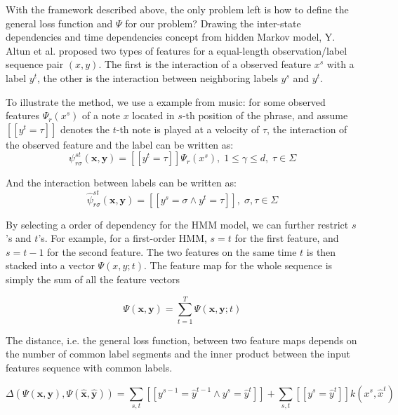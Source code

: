 With the framework described above, the only problem left is how to define the general loss function and $\Psi$ for our problem? Drawing the inter-state dependencies and time dependencies concept from hidden Markov model, Y. Altun et al.\cite{svm2003} proposed two types of features for a equal-length observation/label sequence pair $(x,y)$. The first is the interaction of a observed feature $x^s$ with a label $y^t$, the other is the interaction between neighboring labels $y^s$ and $y^t$. 


To illustrate the method, we use a example from music: for some observed features $\Psi_r(x^s)$ of a note $x$ located in $s$-th position of the phrase, and assume $\left[ \left[ y^t = \tau \right] \right]$ denotes the $t$-th note is played at a velocity of $\tau$, the interaction of the observed feature and the label can be written as:
$$\psi^{st}_{r\sigma}(\mathbf{x}, \mathbf{y}) = \left[\left[y^t = \tau \right] \right]\Psi_r(x^s),\; 1\leq\gamma\leq d,\; \tau \in \Sigma $$

And the interaction between labels can be written as:
$$\hat{\psi}^{st}_{r\sigma}(\mathbf{x}, \mathbf{y}) = \left[\left[y^s = \sigma \wedge y^t = \tau \right] \right],\; \sigma, \tau \in \Sigma $$

By selecting a order of dependency for the HMM model, we can further restrict $s$'s and $t$'s. For example, for a first-order HMM, $s = t$ for the first feature, and $s = t-1$ for the second feature. The two features on the same time $t$ is then stacked into a vector $\Psi(x,y;t)$. The feature map for the whole sequence is simply the sum of all the feature vectors 

$$\Psi(\mathbf{x}, \mathbf{y}) = \sum^T_{t=1}\Psi(\mathbf{x}, \mathbf{y};t)$$

The distance, i.e. the general loss function, between two feature maps depends on the number of common label segments and the inner product between the input features sequence with common labels.


$$\Delta(\Psi(\mathbf{x}, \mathbf{y}), \Psi(\mathbf{\hat{x}}, \mathbf{\hat{y}})) = \sum_{s,t}\left[\left[y^{s-1} = \hat{y}^{t-1}\wedge y^s = \hat{y}^t\right] \right] + \sum_{s,t}\left[\left[y^{s} = \hat{y}^{t}\right] \right]k(x^s, \hat{x}^t)$$

